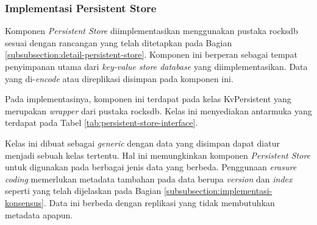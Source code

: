 \subsubsection{Implementasi Persistent Store}
\label{subsubsection:implementasi-persistent-store}

Komponen \textit{Persistent Store} diimplementasikan menggunakan pustaka rocksdb sesuai dengan rancangan yang telah ditetapkan pada Bagian \ref{subsubsection:detail-persistent-store}. Komponen ini berperan sebagai tempat penyimpanan utama dari \textit{key-value store database} yang diimplementasikan. Data yang di-\textit{encode} atau direplikasi disimpan pada komponen ini.

Pada implementasinya, komponen ini terdapat pada kelas KvPersistent yang merupakan \textit{wrapper} dari pustaka rocksdb. Kelas ini menyediakan antarmuka yang terdapat pada Tabel \ref{tab:persistent-store-interface}.

\begin{table}[h]
    \centering
    \caption{Antarmuka Persistent Store}
    \label{tab:persistent-store-interface}
\end{table}

Kelas ini dibuat sebagai \textit{generic} dengan data yang disimpan dapat diatur menjadi sebuah kelas tertentu. Hal ini memungkinkan komponen \textit{Persistent Store} untuk digunakan pada berbagai jenis data yang berbeda. Penggunaan \textit{erasure coding} memerlukan metadata tambahan pada data berupa \textit{version} dan \textit{index} seperti yang telah dijelaskan pada Bagian \ref{subsubsection:implementasi-konsensus}. Data ini berbeda dengan replikasi yang tidak membutuhkan metadata apapun.